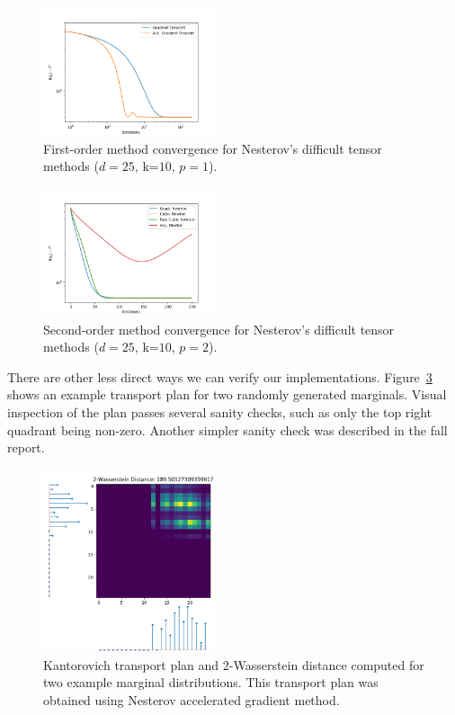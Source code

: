 \documentclass[journal]{IEEEtran}
\begin{document}
\begin{figure}
    \centering
    \includegraphics[width=0.45\textwidth]{img/first_order_correctness.png}
    \caption{First-order method convergence for Nesterov's difficult tensor methods ($d=25$, k=$10$, $p=1$).}
    \label{fig:nesterov_first}
\end{figure}

\begin{figure}
    \centering
    \includegraphics[width=0.45\textwidth]{img/second_order_correctness.png}
    \caption{Second-order method convergence for Nesterov's difficult tensor methods ($d=25$, k=$10$, $p=2$).}
    \label{fig:nesterov_second}
\end{figure}

There are other less direct ways we can verify our implementations. Figure~\ref{fig:ot_example} shows an example transport plan for two randomly generated marginals. Visual inspection of the plan passes several sanity checks, such as only the top right quadrant being non-zero. Another simpler sanity check was described in the fall report.

\begin{figure}
    \centering
    \includegraphics[width=0.45\textwidth]{img/ot.png}
    \caption{Kantorovich transport plan and $2$-Wasserstein distance computed for two example marginal distributions. This transport plan was obtained using Nesterov accelerated gradient method.}
    \label{fig:ot_example}
\end{figure}
\end{document}
